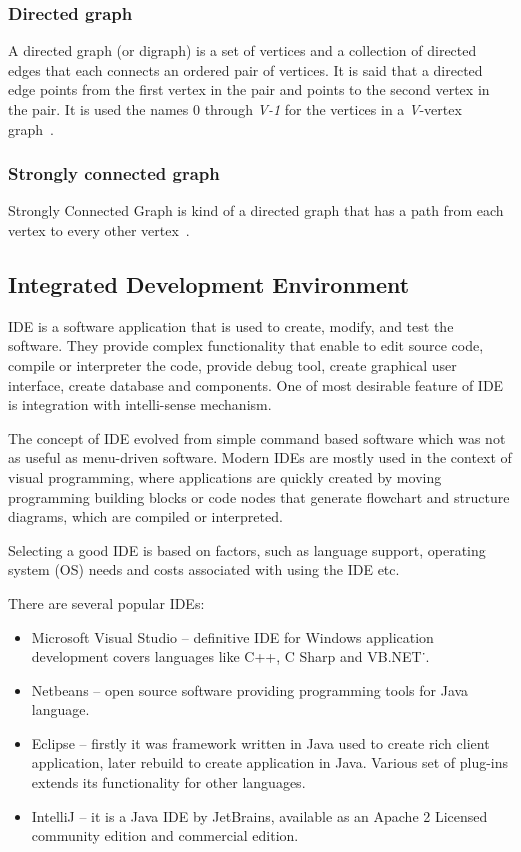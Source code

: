 \subsubsection*{Directed graph}
A directed graph (or digraph) is a set of vertices and a collection of directed edges that each connects an ordered pair of vertices. It is said that a directed edge points from the first vertex in the pair and points to the second vertex in the pair. It is used the names 0 through \textit{V-1} for the vertices in a \textit{V}-vertex graph~\cite{directedGraph}.


\subsubsection*{Strongly connected graph}
Strongly Connected Graph is kind of a directed graph that has a path from each vertex to every other vertex~\cite{alain}. 

\subsection*{Integrated Development Environment}
\ac{IDE} is a software application that is used to create, modify, and test the software. They provide complex functionality that enable to edit source code, compile or interpreter the code, provide debug tool, create graphical user interface, create database and components. One of most desirable feature of \ac{IDE} is integration with intelli-sense mechanism.  

The concept of \ac{IDE} evolved from simple command based software which was not as useful as menu-driven software. Modern \ac{IDE}s are mostly used in the context of visual programming, where applications are quickly created by moving programming building blocks or code nodes that generate flowchart and structure diagrams, which are compiled or interpreted.

Selecting a good \ac{IDE} is based on factors, such as language support, operating system (OS) needs and costs associated with using the \ac{IDE} etc.

There are several popular \ac{IDE}s:
\begin{itemize}
\item Microsoft Visual Studio -- definitive \ac{IDE} for Windows application development covers languages like C++, C Sharp and VB.NET˙.
\item Netbeans -- open source software providing programming tools for Java language.  
\item Eclipse -- firstly it was framework written in Java used to create rich client application, later rebuild to create application in Java. Various set of plug-ins extends its functionality for other languages.  
\item IntelliJ -- it is a Java \ac{IDE} by JetBrains, available as an Apache 2 Licensed community edition and commercial edition.
\end{itemize}







